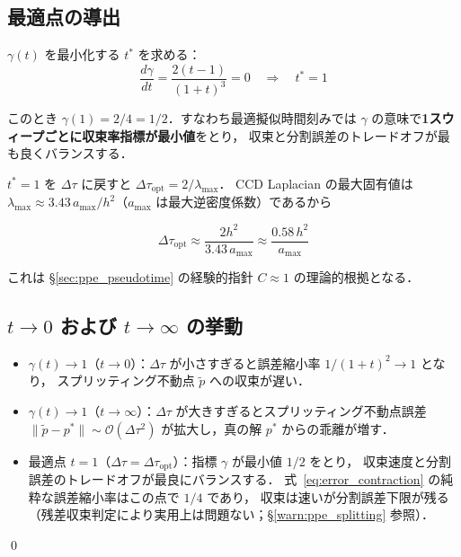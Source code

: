 \subsection*{最適点の導出}

$\gamma(t)$ を最小化する $t^*$ を求める：
\begin{equation}
  \frac{d\gamma}{dt} = \frac{2(t-1)}{(1+t)^3} = 0
  \quad\Longrightarrow\quad t^* = 1
\end{equation}

このとき $\gamma(1) = 2/4 = 1/2$．すなわち最適擬似時間刻みでは
$\gamma$ の意味で\textbf{1スウィープごとに収束率指標が最小値}をとり，
収束と分割誤差のトレードオフが最も良くバランスする．

$t^* = 1$ を $\Delta\tau$ に戻すと $\Delta\tau_{\mathrm{opt}} = 2/\lambda_{\max}$．
CCD Laplacian の最大固有値は $\lambda_{\max} \approx 3.43\,a_{\max}/h^2$（$a_{\max}$ は最大逆密度係数）であるから

\begin{equation}
  \Delta\tau_{\mathrm{opt}} \approx \frac{2h^2}{3.43\,a_{\max}}
                             \approx \frac{0.58\,h^2}{a_{\max}}
  \label{eq:dtau_opt_derive}
\end{equation}

これは §\ref{sec:ppe_pseudotime} の経験的指針 $C \approx 1$ の理論的根拠となる．

\subsection*{$t \to 0$ および $t \to \infty$ の挙動}

\begin{itemize}
  \item $\gamma(t) \to 1$（$t \to 0$）：$\Delta\tau$ が小さすぎると誤差縮小率 $1/(1+t)^2 \to 1$ となり，
        スプリッティング不動点 $\tilde{p}$ への収束が遅い．
  \item $\gamma(t) \to 1$（$t \to \infty$）：$\Delta\tau$ が大きすぎるとスプリッティング不動点誤差
        $\|\tilde{p} - p^*\| \sim \mathcal{O}(\Delta\tau^2)$ が拡大し，真の解 $p^*$ からの乖離が増す．
  \item 最適点 $t=1$（$\Delta\tau = \Delta\tau_{\mathrm{opt}}$）：指標 $\gamma$ が最小値 $1/2$ をとり，
        収束速度と分割誤差のトレードオフが最良にバランスする．
        式~\eqref{eq:error_contraction} の純粋な誤差縮小率はこの点で $1/4$ であり，
        収束は速いが分割誤差下限が残る（残差収束判定により実用上は問題ない；§\ref{warn:ppe_splitting} 参照）．
\end{itemize}
\qed

